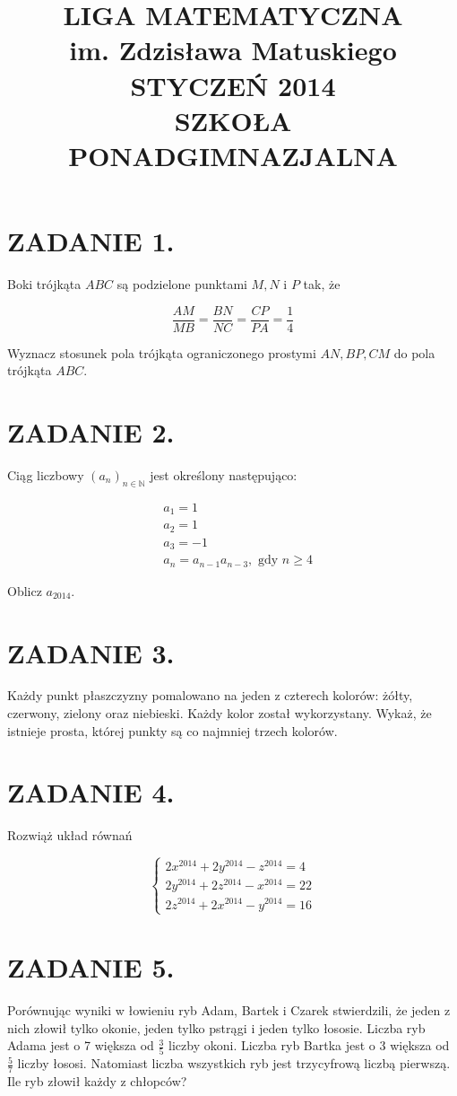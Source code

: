 \documentclass[10pt]{article}
\title{LIGA MATEMATYCZNA \\
 im. Zdzisława Matuskiego \\
 STYCZEŃ 2014 \\
 SZKOŁA PONADGIMNAZJALNA }
\author{}
\date{}
\begin{document}
\maketitle
\section*{ZADANIE 1.}
Boki trójkąta \(A B C\) są podzielone punktami \(M, N\) i \(P\) tak, że

\[
\frac{A M}{M B}=\frac{B N}{N C}=\frac{C P}{P A}=\frac{1}{4}
\]

Wyznacz stosunek pola trójkąta ograniczonego prostymi \(A N, B P, C M\) do pola trójkąta \(A B C\).

\section*{ZADANIE 2.}
Ciąg liczbowy \(\left(a_{n}\right)_{n \in \mathbb{N}}\) jest określony następująco:

\[
\begin{aligned}
& a_{1}=1 \\
& a_{2}=1 \\
& a_{3}=-1 \\
& a_{n}=a_{n-1} a_{n-3}, \text { gdy } n \geqslant 4
\end{aligned}
\]

Oblicz \(a_{2014}\).

\section*{ZADANIE 3.}
Każdy punkt płaszczyzny pomalowano na jeden z czterech kolorów: żółty, czerwony, zielony oraz niebieski. Każdy kolor został wykorzystany. Wykaż, że istnieje prosta, której punkty są co najmniej trzech kolorów.

\section*{ZADANIE 4.}
Rozwiąż układ równań

\[
\left\{\begin{array}{l}
2 x^{2014}+2 y^{2014}-z^{2014}=4 \\
2 y^{2014}+2 z^{2014}-x^{2014}=22 \\
2 z^{2014}+2 x^{2014}-y^{2014}=16
\end{array}\right.
\]

\section*{ZADANIE 5.}
Porównując wyniki w łowieniu ryb Adam, Bartek i Czarek stwierdzili, że jeden z nich złowił tylko okonie, jeden tylko pstrągi i jeden tylko łososie. Liczba ryb Adama jest o 7 większa od \(\frac{3}{5}\) liczby okoni. Liczba ryb Bartka jest o 3 większa od \(\frac{5}{7}\) liczby łososi. Natomiast liczba wszystkich ryb jest trzycyfrową liczbą pierwszą. Ile ryb złowił każdy z chłopców?
\end{document}
